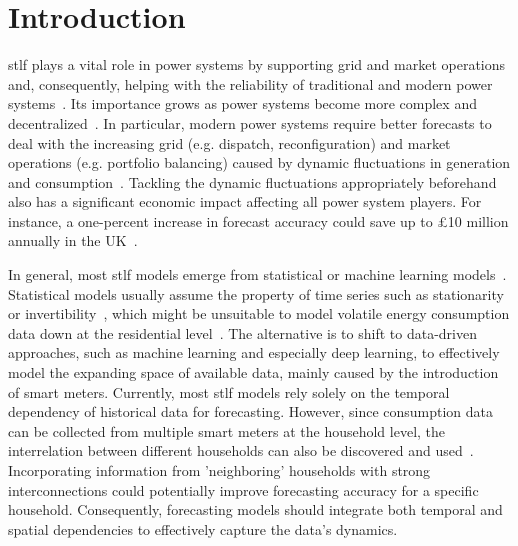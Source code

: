 \section{Introduction}\label{sec:intro}
 \acrfull{stlf} plays a vital role in power systems by supporting grid and market operations and, consequently, helping with the reliability of traditional and modern power systems~\cite{eren2024comprehensive}. Its importance grows as power systems become more complex and decentralized~\cite{big_data_smart_grid}. In particular, modern power systems require better forecasts to deal with the increasing grid (e.g. dispatch, reconfiguration) and market operations (e.g. portfolio balancing) caused by dynamic fluctuations in generation and consumption~\cite{big_data_smart_grid}. Tackling the dynamic fluctuations appropriately beforehand also has a significant economic impact affecting all power system players. For instance, a one-percent increase in forecast accuracy could save up to £10 million annually in the UK~\cite{arastehfar_short-term_2022}.

In general, most \acrshort{stlf} models emerge from statistical or machine learning models~\cite{hong_probabilistic_2016}. Statistical models usually assume the property of time series such as stationarity or invertibility~\cite{arastehfar_short-term_2022}, which might be unsuitable to model volatile energy consumption data down at the residential level~\cite{Moustati2024-oo}. The alternative is to shift to data-driven approaches, such as machine learning and especially deep learning, to effectively model the expanding space of available data, mainly caused by the introduction of smart meters.  
Currently, most \acrshort{stlf} models rely solely on the temporal dependency of historical data for forecasting. However, since consumption data can be collected from multiple smart meters at the household level, the interrelation between different households can also be discovered and used~\cite{WU2023125939}. Incorporating information from 'neighboring' households with strong interconnections could potentially improve forecasting accuracy for a specific household. Consequently, forecasting models should integrate both temporal and spatial dependencies to effectively capture the data's dynamics.

